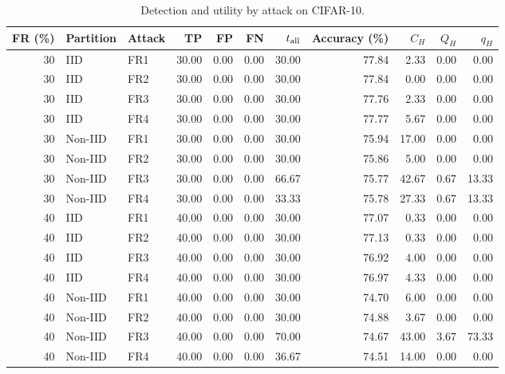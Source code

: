 \begin{table}[t]
\centering\footnotesize\setlength{\tabcolsep}{4pt}
\caption{Detection and utility by attack on CIFAR-10.}\label{tab:detail-cifar10}
\begin{tabular}{rllrrrrrrrr}
\toprule
FR (\%) & Partition & Attack & TP & FP & FN & $t_{\rm all}$ & Accuracy (\%) & $C_H$ & $Q_H$ & $q_H$ \\
\midrule
30 & IID & FR1 & 30.00 & 0.00 & 0.00 & 30.00 & 77.84 & 2.33 & 0.00 & 0.00 \\
30 & IID & FR2 & 30.00 & 0.00 & 0.00 & 30.00 & 77.84 & 0.00 & 0.00 & 0.00 \\
30 & IID & FR3 & 30.00 & 0.00 & 0.00 & 30.00 & 77.76 & 2.33 & 0.00 & 0.00 \\
30 & IID & FR4 & 30.00 & 0.00 & 0.00 & 30.00 & 77.77 & 5.67 & 0.00 & 0.00 \\
30 & Non-IID & FR1 & 30.00 & 0.00 & 0.00 & 30.00 & 75.94 & 17.00 & 0.00 & 0.00 \\
30 & Non-IID & FR2 & 30.00 & 0.00 & 0.00 & 30.00 & 75.86 & 5.00 & 0.00 & 0.00 \\
30 & Non-IID & FR3 & 30.00 & 0.00 & 0.00 & 66.67 & 75.77 & 42.67 & 0.67 & 13.33 \\
30 & Non-IID & FR4 & 30.00 & 0.00 & 0.00 & 33.33 & 75.78 & 27.33 & 0.67 & 13.33 \\
\midrule
40 & IID & FR1 & 40.00 & 0.00 & 0.00 & 30.00 & 77.07 & 0.33 & 0.00 & 0.00 \\
40 & IID & FR2 & 40.00 & 0.00 & 0.00 & 30.00 & 77.13 & 0.33 & 0.00 & 0.00 \\
40 & IID & FR3 & 40.00 & 0.00 & 0.00 & 30.00 & 76.92 & 4.00 & 0.00 & 0.00 \\
40 & IID & FR4 & 40.00 & 0.00 & 0.00 & 30.00 & 76.97 & 4.33 & 0.00 & 0.00 \\
40 & Non-IID & FR1 & 40.00 & 0.00 & 0.00 & 30.00 & 74.70 & 6.00 & 0.00 & 0.00 \\
40 & Non-IID & FR2 & 40.00 & 0.00 & 0.00 & 30.00 & 74.88 & 3.67 & 0.00 & 0.00 \\
40 & Non-IID & FR3 & 40.00 & 0.00 & 0.00 & 70.00 & 74.67 & 43.00 & 3.67 & 73.33 \\
40 & Non-IID & FR4 & 40.00 & 0.00 & 0.00 & 36.67 & 74.51 & 14.00 & 0.00 & 0.00 \\
\bottomrule
\end{tabular}
\end{table}
